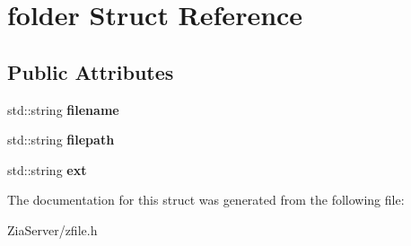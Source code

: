 \hypertarget{structfolder}{
\section{folder Struct Reference}
\label{structfolder}
}
\subsection*{Public Attributes}
\begin{DoxyCompactItemize}
\item 
\hypertarget{structfolder_a3e484208c282ad2552bd84ea4ca79242}{
std::string {\bfseries filename}}
\label{structfolder_a3e484208c282ad2552bd84ea4ca79242}

\item 
\hypertarget{structfolder_a8f3d16f6b6f792acf0fd95fc0d48875c}{
std::string {\bfseries filepath}}
\label{structfolder_a8f3d16f6b6f792acf0fd95fc0d48875c}

\item 
\hypertarget{structfolder_a6ebf50c67fb55c0f7f3a4469ace26768}{
std::string {\bfseries ext}}
\label{structfolder_a6ebf50c67fb55c0f7f3a4469ace26768}

\end{DoxyCompactItemize}


The documentation for this struct was generated from the following file:\begin{DoxyCompactItemize}
\item 
ZiaServer/zfile.h\end{DoxyCompactItemize}
